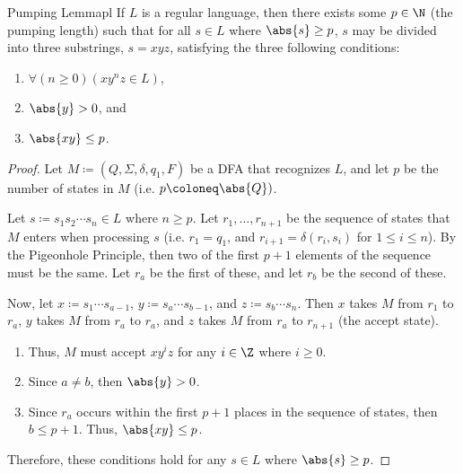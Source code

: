 \documentclass[math]{amznotes}
\begin{document}
\begin{thmbox}{Pumping Lemma}{pl}
    If $L$ is a regular language, then there exists some $p \in \N$ (the pumping length) such that for all $s \in L$ where $\abs{s} \geq p$, $s$ may be divided into three substrings, $s = x y z$, satisfying the three following conditions:
    \begin{enumerate}[noitemsep]
        \item $\forall (n \geq 0) \left( x y^n z \in L \right)$,
        \item $\abs{y} > 0$, and
        \item $\abs{x y} \leq p$.
    \end{enumerate}
    \tcblower
    \begin{proof}
        Let $M \coloneq  (Q, \Sigma, \delta, q_1, F)$ be a DFA that recognizes $L$, and let $p$ be the number of states in $M$ (i.e. $p \coloneq \abs{Q})$.

        Let $s \coloneq s_1 s_2 \cdots s_n \in L$ where $n \geq p$. Let $r_1, \ldots, r_{n+1}$ be the sequence of states that $M$ enters when processing $s$ (i.e. $r_1 = q_1$, and $r_{i+1} = \delta(r_i, s_i)$ for $1 \leq i \leq n$). By the Pigeonhole Principle, then two of the first $p+1$ elements of the sequence must be the same. Let $r_a$ be the first of these, and let $r_b$ be the second of these.

        Now, let $x \coloneq s_1 \cdots s_{a-1}$, $y \coloneq s_a \cdots s_{b-1}$, and $z \coloneq s_b \cdots s_n$. Then $x$ takes $M$ from $r_1$ to $r_a$, $y$ takes $M$ from $r_a$ to $r_a$, and $z$ takes $M$ from $r_a$ to $r_{n+1}$ (the accept state).
        \begin{enumerate}
            \item Thus, $M$ must accept $xy^iz$ for any $i \in \Z$ where $i \geq 0$.
            \item Since $a \neq b$, then $\abs{y} > 0$.
            \item Since $r_a$ occurs within the first $p+1$ places in the sequence of states, then $b \leq p+1$. Thus, $\abs{xy} \leq p$.
        \end{enumerate}
        Therefore, these conditions hold for any $s \in L$ where $\abs{s} \geq p$.
    \end{proof}
\end{thmbox}
\end{document}
